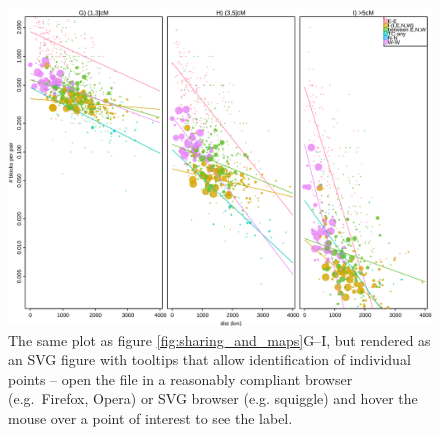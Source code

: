 \documentclass{article}
\begin{document}
\begin{figure}[!htp]
  \begin{center}
    \vspace{2em}
    \begin{center}
        \includegraphics{sharing-rates.svg}
    \end{center}
    \vspace{2em}
    \caption{
    The same plot as figure \ref{fig:sharing_and_maps}G--I, but rendered as an SVG figure
    with tooltips that allow identification of individual points \citep[using {\tt R}][]{plate2011rsvgtipsdevice} --
    open the file in a reasonably compliant browser (e.g.\ Firefox, Opera) or SVG browser (e.g. squiggle)
    and hover the mouse over a point of interest to see the label.
    \label{sfig:sharing_rates_svg}
    }
  \end{center}
\end{figure}
\end{document}
